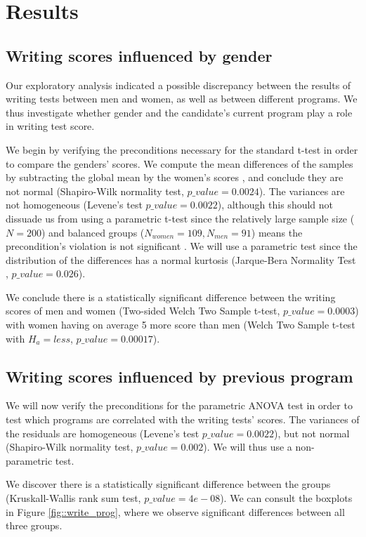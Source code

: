 \documentclass[10pt]{article}
\begin{document}
	\section{Results}
	\label{sec::results}
	
	\subsection{Writing scores influenced by gender}
	Our exploratory analysis indicated a possible discrepancy between the results of writing tests between men and women, as well as between different programs. We thus investigate whether gender and the candidate's current program play a role in writing test score.
	
	We begin by verifying the preconditions necessary for the standard t-test in order to compare the genders' scores. We compute the mean differences of the samples by subtracting the global mean by the women's scores \parencite{means}, and conclude they are not normal (Shapiro-Wilk normality test, $p\_value = 0.0024$). The variances are not homogeneous (Levene's test $p\_value = 0.0022$), although this should not dissuade us from using a parametric t-test since the relatively large sample size ($N=200$) and balanced groups ($N_{women} = 109, N_{men} = 91$) means the precondition's violation is not significant \parencite{variances}. We will use a parametric test since the distribution of the differences has a normal kurtosis (Jarque-Bera Normality Test \cite{jarque}, $p\_value=0.026$).
	
	We conclude there is a statistically significant difference between the writing scores of men and women (Two-sided Welch Two Sample t-test, $p\_value = 0.0003$) with women having on average 5 more score than men (Welch Two Sample t-test with $H_a = less$, $p\_value = 0.00017$).
	
	
	\subsection{Writing scores influenced by previous program}
	We will now verify the preconditions for the parametric ANOVA test in order to test which programs are correlated with the writing tests' scores. The variances of the residuals are homogeneous (Levene's test $p\_value = 0.0022$), but not normal (Shapiro-Wilk normality test, $p\_value = 0.002$). We will thus use a non-parametric test.
	
	We discover there is a statistically significant difference between the groups (Kruskall-Wallis rank sum test, $p\_value=4e-08$). We can consult the boxplots in Figure \ref{fig::write_prog}, where we observe significant differences between all three groups.
	
\end{document}
